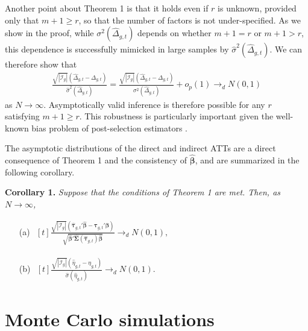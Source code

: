 \documentclass[12pt,fleqn]{article}
\def\+#1{\boldsymbol{#1}}
\begin{document}
Another point about Theorem 1 is that it holds even if $r$ is unknown, provided only that $m+1 \geq r$, so that the number of factors is not under-specified. As we show in the proof, while $\sigma^2(\widehat \Delta_{g,t})$ depends on whether $m+1 = r$ or $m+1 > r$, this dependence is successfully mimicked in large samples by $\widehat \sigma^2(\widehat \Delta_{g,t})$. We can therefore show that
\begin{align}
\frac{\sqrt{|\mathcal{I}_g|}(\widehat \Delta_{g,t} - \Delta_{g,t})}{\widehat \sigma^2(\widehat \Delta_{g,t})} = \frac{\sqrt{|\mathcal{I}_g|}(\widehat \Delta_{g,t} - \Delta_{g,t})}{\sigma^2(\widehat \Delta_{g,t})} + o_p(1) \to_d N(0, 1 )
\end{align}
as $N\to\infty$. Asymptotically valid inference is therefore possible for any $r$ satisfying $m+1 \geq r$. This robustness is particularly important given the well-known bias problem of post-selection estimators \citep{leeb2005model}.

The asymptotic distributions of the direct and indirect ATTs are a direct consequence of Theorem 1 and the consistency of $\widehat{\+\beta}$, and are summarized in the following corollary.

\bigskip

\noindent \textbf{Corollary 1.} \emph{Suppose that the conditions of Theorem 1 are met. Then, as $N\to\infty$,}
\begin{itemize}
  \item[(a)] $\begin{aligned}[t]
    \frac{\sqrt{|\mathcal{I}_g|} ( \widehat{\+\tau}_{g,t}'\widehat{\+\beta} - \+\tau_{g,t}'\+\beta )}{\sqrt{\widehat{\+\beta}'\widehat{\+\Sigma}(\widehat{\+\tau}_{g,t})\widehat{\+\beta}}  } \to_d N(0, 1 ),
    \end{aligned}$

  \item[(b)] $\begin{aligned}[t]
    \frac{\sqrt{|\mathcal{I}_g|}(  \widehat \eta_{g,t} - \eta_{g,t} )}{\widehat{\sigma}(\widehat{\eta}_{g,t})}  \to_d N(0,1).
    \end{aligned}$
\end{itemize}

\section{Monte Carlo simulations}
\end{document}
